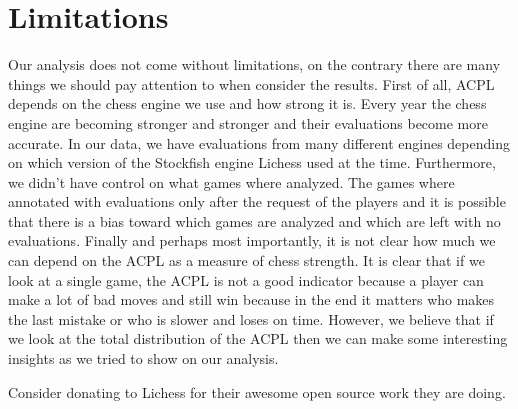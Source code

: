 \documentclass{article}
\begin{document}
\section{Limitations}
Our analysis does not come without limitations, on the contrary there are many things we should pay attention to when consider the results. First of all, ACPL depends on the chess engine we use and how strong it is. Every year the chess engine are becoming stronger and stronger and their evaluations become more accurate. In our data, we have evaluations from many different engines depending on which version of the Stockfish engine Lichess used at the time. Furthermore, we didn’t have control on what games where analyzed. The games where annotated with evaluations only after the request of the players and it is possible that there is a bias toward which games are analyzed and which are left with no evaluations. Finally and perhaps most importantly, it is not clear how much we can depend on the ACPL as a measure of chess strength. It is clear that if we look at a single game, the ACPL is not a good indicator because a player can make a lot of bad moves and still win because in the end it matters who makes the last mistake or who is slower and loses on time. However, we believe that if we look at the total distribution of the ACPL then we can make some interesting insights as we tried to show on our analysis.

Consider donating to Lichess for their awesome open source work they are doing.



\end{document}
